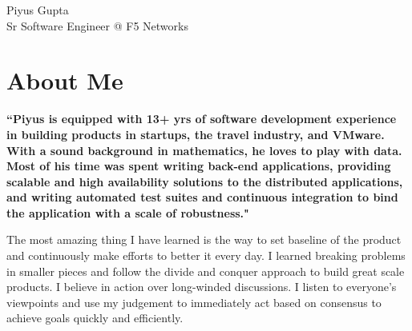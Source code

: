 \documentclass[10pt]{article} %
\begin{document}
\begin{paracol}{2} %


\parbox[top][0.12\textheight][c]{\linewidth}{ %
	\vspace{-0.04\textheight} %
	\centering %
	{\sffamily\Huge Piyus Gupta}\\\medskip %
	{\Large Sr Software Engineer @ F5 Networks}
}


\section{About Me}

{\raggedright\textbf{``Piyus is equipped with 13+ yrs of software development experience in building products in startups, the travel industry, and VMware. With a sound background in mathematics, he loves to play with data. Most of his time was spent writing back-end applications, providing scalable and high availability solutions to the distributed applications, and writing automated test suites and continuous integration to bind the application with a scale of robustness."}\\\medskip}

    {The most amazing thing I have learned is the way to set baseline of the product and continuously make efforts to better it every day.}
    {I learned breaking problems in smaller pieces and follow the divide and conquer approach to build great scale products.}
    {I believe in action over long-winded discussions. I listen to everyone's viewpoints and use my judgement to immediately act based on consensus to achieve goals quickly and efficiently.}

\medskip %



\end{paracol}
\end{document}
